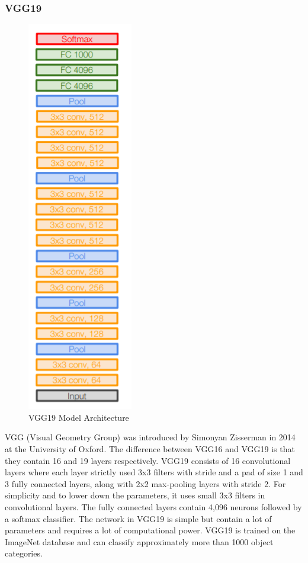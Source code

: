 \subsubsection{VGG19}
\begin{figure}[H]
\centering
\includegraphics[scale=1.0]{images/Chapter4/vgg19_arch.png}
\caption{VGG19 Model Architecture \cite{vgg19_architecture}}
\label{vgg19_arch}
\end{figure}
\par
VGG (Visual Geometry Group) was introduced by Simonyan Zisserman in 2014 at the University of Oxford. The difference between VGG16 and VGG19 is that they contain 16 and 19 layers respectively. VGG19 consists of 16 convolutional layers where each layer strictly used 3x3 filters with stride and a pad of size 1 and 3 fully connected layers, along with 2x2 max-pooling layers with stride 2. For simplicity and to lower down the parameters, it uses small 3x3 filters in convolutional layers. The fully connected layers contain 4,096 neurons followed by a softmax classifier. The network in VGG19 is simple but contain a lot of parameters and requires a lot of computational power. VGG19 is trained on the ImageNet database and can classify approximately more than 1000 object categories.